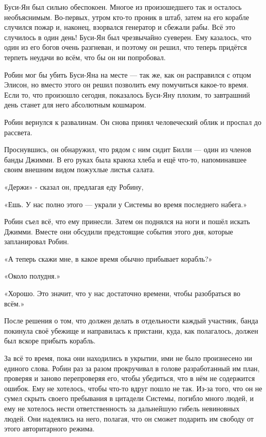 \documentclass[a4paper,12pt]{book}
\begin{document}
\par
Буси-Ян был сильно обеспокоен. Многое из произошедшего так и осталось необъяснимым. Во-первых, утром кто-то проник в штаб, затем на его корабле случился пожар и, наконец, взорвался генератор и сбежали рабы. Всё это случилось в один день! Буси-Ян был чрезвычайно суеверен. Ему казалось, что один из его богов очень разгневан, и поэтому он решил, что теперь придётся терпеть неудачи во всём, что бы он ни попробовал.
\par
Робин мог бы убить Буси-Яна на месте — так же, как он расправился с отцом Элисон, но вместо этого он решил позволить ему помучиться какое-то время. Если то, что произошло сегодня, показалось Буси-Яну плохим, то завтрашний день станет для него абсолютным кошмаром.\\
\par
Робин вернулся к развалинам. Он снова принял человеческий облик и проспал до рассвета.
\par
Проснувшись, он обнаружил, что рядом с ним сидит Билли — один из членов банды Джимми. В его руках была краюха хлеба и ещё что-то, напоминавшее своим внешним видом пожухлые листья салата.
\par
«Держи» - сказал он, предлагая еду Робину,
\par
«Ешь. У нас полно этого — украли у Системы во время последнего набега.»
\par
Робин съел всё, что ему принесли. Затем он поднялся на ноги и пошёл искать Джимми. Вместе они обсудили предстоящие события этого дня, которые запланировал Робин.
\par
«А теперь скажи мне, в какое время обычно прибывает корабль?»
\par
«Около полудня.»
\par
«Хорошо. Это значит, что у нас достаточно времени, чтобы разобраться во всём.»\\
\par
После решения о том, что должен делать в отдельности каждый участник, банда покинула своё убежище и направилась к пристани, куда, как полагалось, должен был вскоре прибыть корабль.
\par
За всё то время, пока они находились в укрытии, ими не было произнесено ни единого слова. Робин раз за разом прокручивал в голове разработанный им план, проверяя и заново перепроверяя его, чтобы убедиться, что в нём не содержится ошибок. Ему не хотелось, чтобы что-то вдруг пошло не так. Из-за того, что он не сумел скрыть своего пребывания в цитадели Системы, погибло много людей, и ему не хотелось нести ответственность за дальнейшую гибель невиновных людей. Они надеялись на него, полагая, что он сможет подарить им свободу от этого авторитарного режима.
\end{document}
